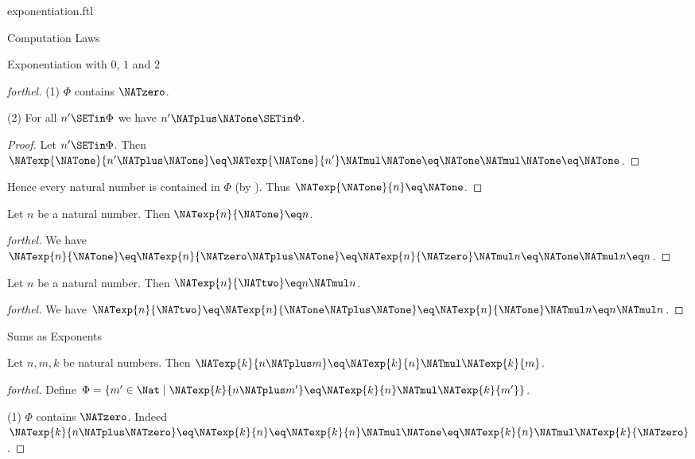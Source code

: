 \documentclass{naproche-library}
\begin{document}
\begin{smodule}[title=Exponentiation]{exponentiation.ftl}
\begin{sfragment}{Computation Laws}
\begin{sfragment}{Exponentiation with $0$, $1$ and $2$}
\begin{proof}[forthel]
      (1) $\Phi$ contains $\NATzero$.

      (2) For all $n' \SETin \Phi$ we have $n' \NATplus \NATone \SETin \Phi$.
      \begin{proof}
        Let $n' \SETin \Phi$.
        Then $\NATexp{\NATone}{n' \NATplus \NATone}
          \eq \NATexp{\NATone}{n'} \NATmul \NATone
          \eq \NATone \NATmul \NATone
          \eq \NATone$.
      \end{proof}

      Hence every natural number is contained in $\Phi$ (by ).
      Thus $\NATexp{\NATone}{n} \eq \NATone$.
    \end{proof}

    \begin{proposition}[forthel,id=ARITHMETIC_09_4975279749464064]
      Let $n$ be a natural number.
      Then $\NATexp{n}{\NATone} \eq n$.
    \end{proposition}
    \begin{proof}[forthel]
      We have $\NATexp{n}{\NATone}
        \eq \NATexp{n}{\NATzero \NATplus \NATone}
        \eq \NATexp{n}{\NATzero} \NATmul n
        \eq \NATone \NATmul n
        \eq n$.
    \end{proof}

    \begin{proposition}[forthel,id=ARITHMETIC_09_8513812055457792]
      Let $n$ be a natural number.
      Then $\NATexp{n}{\NATtwo} \eq n \NATmul n$.
    \end{proposition}
    \begin{proof}[forthel]
      We have $\NATexp{n}{\NATtwo}
        \eq \NATexp{n}{\NATone \NATplus \NATone}
        \eq \NATexp{n}{\NATone} \NATmul n
        \eq n \NATmul n$.
    \end{proof}
  \end{sfragment}

  \begin{sfragment}{Sums as Exponents}
    \begin{proposition}[forthel,id=ARITHMETIC_09_8152207530655744]
      Let $n, m, k$ be natural numbers.
      Then $\NATexp{k}{n \NATplus m} \eq \NATexp{k}{n} \NATmul \NATexp{k}{m}$.
    \end{proposition}
    \begin{proof}[forthel]
      Define $\Phi = \{ m' \in \Nat \mid \NATexp{k}{n \NATplus m'} \eq \NATexp{k}{n} \NATmul \NATexp{k}{m'} \}$.

      (1) $\Phi$ contains $\NATzero$.
      Indeed $\NATexp{k}{n \NATplus \NATzero}
        \eq \NATexp{k}{n}
        \eq \NATexp{k}{n} \NATmul \NATone
        \eq \NATexp{k}{n} \NATmul \NATexp{k}{\NATzero}$.


\end{proof}
\end{sfragment}
\end{sfragment}
\end{smodule}
\end{document}
